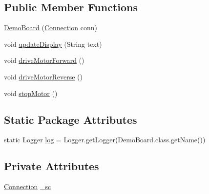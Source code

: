 \subsection*{Public Member Functions}
\begin{DoxyCompactItemize}
\item 
\hyperlink{classrob_o_s2_1_1hardware_1_1baratta_1_1_demo_board_a5564ffc2eacf8f3c733141d99adcdf17}{DemoBoard} (\hyperlink{classrob_o_s2_1_1serial_1_1_connection}{Connection} conn)
\item 
void \hyperlink{classrob_o_s2_1_1hardware_1_1baratta_1_1_demo_board_aef0119fc18fba35d0876f37b8a6488f8}{updateDisplay} (String text)
\item 
void \hyperlink{classrob_o_s2_1_1hardware_1_1baratta_1_1_demo_board_a0bf2f4bf168a9dbaf303d93eb3114fae}{driveMotorForward} ()
\item 
void \hyperlink{classrob_o_s2_1_1hardware_1_1baratta_1_1_demo_board_a6db0b214ba57e82f32840acd869352e1}{driveMotorReverse} ()
\item 
void \hyperlink{classrob_o_s2_1_1hardware_1_1baratta_1_1_demo_board_aa8efc5927f83ba0ad1b3ce331b3729b0}{stopMotor} ()
\end{DoxyCompactItemize}
\subsection*{Static Package Attributes}
\begin{DoxyCompactItemize}
\item 
static Logger \hyperlink{classrob_o_s2_1_1hardware_1_1baratta_1_1_demo_board_a1faa9111e6c6adb19eb51f709532b77d}{log} = Logger.getLogger(DemoBoard.class.getName())
\end{DoxyCompactItemize}
\subsection*{Private Attributes}
\begin{DoxyCompactItemize}
\item 
\hyperlink{classrob_o_s2_1_1serial_1_1_connection}{Connection} \hyperlink{classrob_o_s2_1_1hardware_1_1baratta_1_1_demo_board_ae24ad624c42e0ab252e19ac9e6b2aa55}{\_\-sc}
\end{DoxyCompactItemize}


